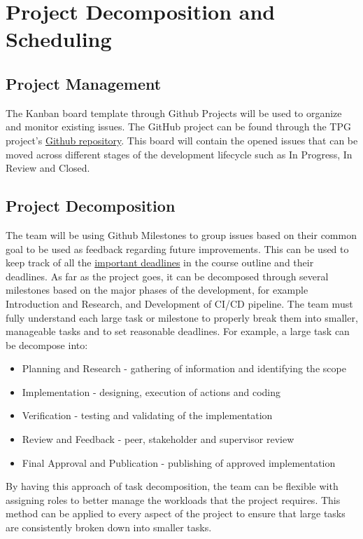\documentclass{article}
\begin{document}
\section{Project Decomposition and Scheduling}

\subsection{Project Management}
The Kanban board template through Github Projects will be used to organize and monitor existing issues. The GitHub project can be found through the TPG project’s \href{https://github.com/orgs/TPGEngine/projects/1}{Github repository}. This board will contain the opened issues that can be moved across different stages of the development lifecycle such as In Progress, In Review and Closed. 

\subsection{Project Decomposition}
The team will be using Github Milestones to group issues based on their common goal to be used as feedback regarding future improvements. This can be used to keep track of all the \href{https://github.com/TPGEngine/tpg/milestones}{important deadlines} in the course outline and their deadlines. As far as the project goes, it can be decomposed through several milestones based on the major phases of the development, for example Introduction and Research, and Development of CI/CD pipeline. The team must fully understand each large task or milestone to properly break them into smaller, manageable tasks and to set reasonable deadlines. For example, a large task can be decompose into:

\begin{itemize}
  \item Planning and Research - gathering of information and identifying the scope
  \item Implementation - designing, execution of actions and coding
  \item Verification - testing and validating of the implementation
  \item Review and Feedback - peer, stakeholder and supervisor review
  \item Final Approval and Publication - publishing of approved implementation
\end{itemize}

\noindent By having this approach of task decomposition, the team can be flexible with assigning roles to better manage the workloads that the project requires. This method can be applied to every aspect of the project to ensure that large tasks are consistently broken down into smaller tasks.
\end{document}
